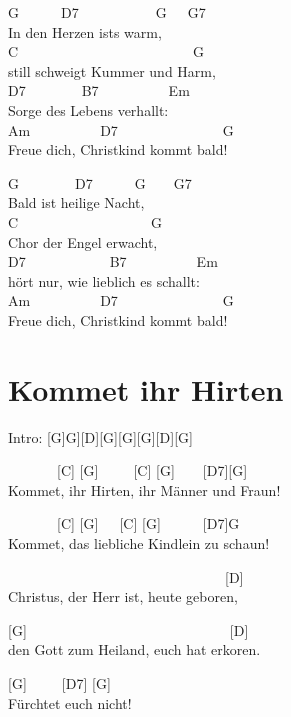 \documentclass[
  letterpaper,
]{scrbook}
\begin{document}
G~~~~~~D7~~~~~~~~~~~G~~~G7\\
In den Herzen ist\textquotesingle s warm,\\
C~~~~~~~~~~~~~~~~~~~~~~~~~G\\
still schweigt Kummer und Harm,\\
D7~~~~~~~~B7~~~~~~~~~~Em\\
Sorge des Lebens verhallt:\\
Am~~~~~~~~~~D7~~~~~~~~~~~~~~~G\\
Freue dich, Christkind kommt bald!

G~~~~~~~~D7~~~~~~G~~~~G7\\
Bald ist heilige Nacht,\\
C~~~~~~~~~~~~~~~~~~~G\\
Chor der Engel erwacht,\\
D7~~~~~~~~~~~~B7~~~~~~~~~~Em\\
hört nur, wie lieblich es schallt:\\
Am~~~~~~~~~~D7~~~~~~~~~~~~~~~G\\
Freue dich, Christkind kommt bald!

\hypertarget{kommet-ihr-hirten}{%
\chapter{Kommet ihr Hirten}\label{kommet-ihr-hirten}}

Intro: {[}G{]}G{]}{[}D{]}{[}G{]}{[}G{]}{[}G{]}{[}D{]}{[}G{]}

~~~~~~~{[}C{]} {[}G{]}~~~~~{[}C{]} {[}G{]}~~~~{[}D7{]}{[}G{]}\\
Kommet, ihr Hirten, ihr Männer und Fraun!

~~~~~~~{[}C{]} {[}G{]}~~~{[}C{]} {[}G{]}~~~~~~{[}D7{]}G\\
Kommet, das liebliche Kindlein zu schaun!

~~~~~~~~~~~~~~~~~~~~~~~~~~~~~~~{[}D{]}\\
Christus, der Herr ist, heute geboren,

{[}G{]}~~~~~~~~~~~~~~~~~~~~~~~~~~~~~{[}D{]}\\
den Gott zum Heiland, euch hat erkoren.

{[}G{]}~~~~~{[}D7{]} {[}G{]}\\
Fürchtet euch nicht!
\end{document}
